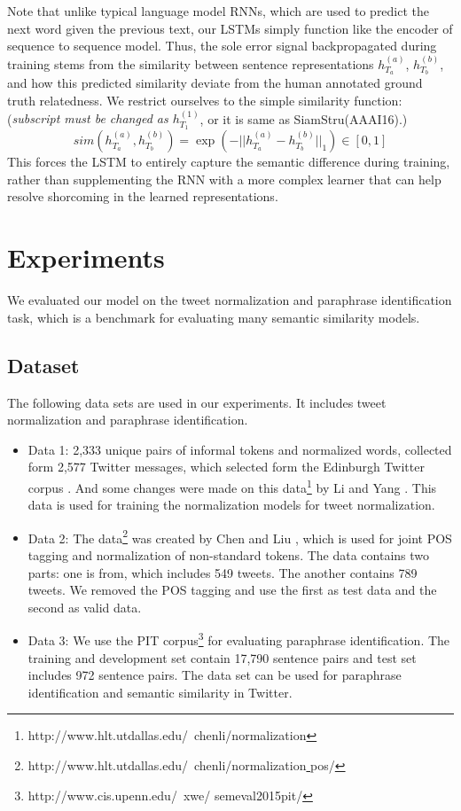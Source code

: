 \documentclass[letterpaper]{article}
\begin{document}
Note that unlike typical language model RNNs, which are used to predict the next word given the previous text, our LSTMs simply function like the encoder of sequence to sequence model. Thus, the sole error signal backpropagated during training stems from the similarity between sentence representations \textit{$h_{T_{a}}^{(a)}$}, \textit{$h_{T_{b}}^{(b)}$}, and how this predicted similarity deviate from the human annotated ground truth relatedness. We restrict ourselves to the simple similarity function: (\textit{subscript must be changed as $h_{T_{1}}^{(1)}$}, or it is same as SiamStru(AAAI16).)
\begin{equation}\label{key}
sim(h_{T_{a}}^{(a)},h_{T_{b}}^{(b)}) = \exp(-||h_{T_{a}}^{(a)}-h_{T_{b}}^{(b)}||_{1}) \in [0,1]
\end{equation}
This forces the LSTM to entirely capture the semantic difference during training, rather than supplementing the RNN with a more complex learner that can help resolve shorcoming in the learned representations.

\section{Experiments}
We evaluated our model on the tweet normalization and paraphrase identification task, which is a benchmark for evaluating many semantic similarity models.

\subsection{Dataset}
The following data sets are used in our experiments. It includes tweet normalization and paraphrase identification.

\begin{itemize}
	\item Data 1: 2,333 unique pairs of informal tokens and normalized words, collected form 2,577 Twitter messages, which selected form the Edinburgh Twitter corpus \cite{pennell-liu:2011:IJCNLP-2011}. And some changes were made on this data\footnote{http://www.hlt.utdallas.edu/~chenli/normalization} by Li and Yang . This data is used for training the normalization models for tweet normalization.
	\item Data 2: The data\footnote{http://www.hlt.utdallas.edu/~chenli/normalization\underline{ }pos/} was created by Chen and Liu , which is used for joint POS tagging and normalization of non-standard tokens. The data contains two parts: one is from, which includes 549 tweets. The another contains 789 tweets. We removed the POS tagging and use the first as test data and the second as valid data.
	\item Data 3: We use the PIT corpus\footnote{http://www.cis.upenn.edu/~xwe/
	semeval2015pit/} for evaluating paraphrase identification. The training and development set contain 17,790 sentence pairs and test set includes 972 sentence pairs\cite{xu-callisonburch-dolan:2015:SemEval}. The data set can be used for paraphrase identification and semantic similarity in Twitter.
\end{itemize}
\end{document}

